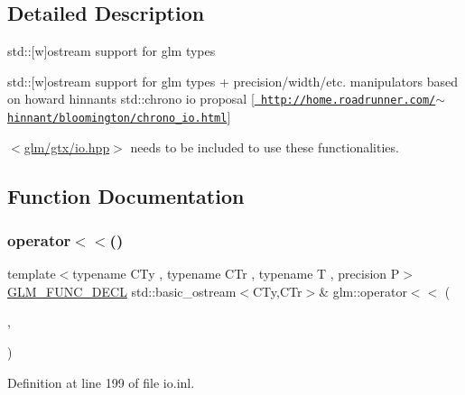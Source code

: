 \subsection{Detailed Description}
std\+:\+:\mbox{[}w\mbox{]}ostream support for glm types 

std\+:\+:\mbox{[}w\mbox{]}ostream support for glm types + precision/width/etc. manipulators based on howard hinnant\textquotesingle{}s std\+::chrono io proposal \mbox{[}\href{http://home.roadrunner.com/~hinnant/bloomington/chrono_io.html}{\texttt{ http\+://home.\+roadrunner.\+com/$\sim$hinnant/bloomington/chrono\+\_\+io.\+html}}\mbox{]}

$<$\mbox{\hyperlink{io_8hpp}{glm/gtx/io.\+hpp}}$>$ needs to be included to use these functionalities. 

\subsection{Function Documentation}
\mbox{\label{group__gtx__io_ga038d37e8d7965dc7bfae5dc23e4140af}} 
\subsubsection{\texorpdfstring{operator$<$$<$()}{operator<<()}\hspace{0.1cm}{\footnotesize\ttfamily [1/15]}}
{\footnotesize\ttfamily template$<$typename C\+Ty , typename C\+Tr , typename T , precision P$>$ \\
\mbox{\hyperlink{setup_8hpp_ab2d052de21a70539923e9bcbf6e83a51}{G\+L\+M\+\_\+\+F\+U\+N\+C\+\_\+\+D\+E\+CL}} std\+::basic\+\_\+ostream$<$C\+Ty,C\+Tr$>$\& glm\+::operator$<$$<$ (\begin{DoxyParamCaption}\item[{std\+::basic\+\_\+ostream$<$ C\+Ty, C\+Tr $>$ \&}]{,  }\item[{\mbox{\hyperlink{structglm_1_1tquat}{tquat}}$<$ T, P $>$ const \&}]{ }\end{DoxyParamCaption})}



Definition at line 199 of file io.\+inl.

\mbox{\label{group__gtx__io_ga171289d1671b75e033a1b078c68a7460}} 
